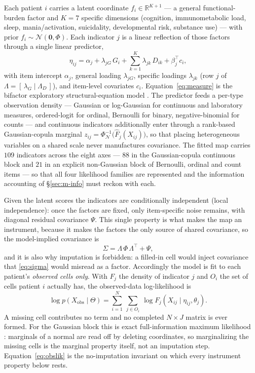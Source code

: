 Each patient $i$ carries a latent coordinate $f_i\in\mathbb{R}^{K+1}$ --- a general
functional-burden factor \Gfac{} and $K=7$ specific dimensions (cognition,
immunometabolic load, sleep, mania/activation, suicidality, developmental risk,
substance use) --- with prior $f_i\sim\mathcal N(\mathbf 0,\Phi)$. Each indicator
$j$ is a linear reflection of those factors through a single linear predictor,
\begin{equation}
  \eta_{ij}=\alpha_j+\lambda_{jG}\,G_i+\sum_{k=1}^{K}\lambda_{jk}\,D_{ik}+\beta_j^{\top}c_i ,
  \label{eq:measure}
\end{equation}
with item intercept $\alpha_j$, general loading $\lambda_{jG}$, specific loadings
$\lambda_{jk}$ (row $j$ of $\Lambda=[\,\lambda_G\mid\Lambda_D\,]$), and item-level
covariates $c_i$. Equation~\eqref{eq:measure} is the bifactor exploratory
structural-equation model \citep{reise2012bifactor,asparouhov2009esem}. The
predictor feeds a per-type observation density --- Gaussian or log-Gaussian for
continuous and laboratory measures, ordered-logit for ordinal, Bernoulli for
binary, negative-binomial for counts --- and continuous indicators additionally
enter through a rank-based Gaussian-copula marginal
$z_{ij}=\Phi_{\mathcal N}^{-1}\!\big(\hat F_j(X_{ij})\big)$, so that placing
heterogeneous variables on a shared scale never manufactures covariance. The fitted map carries $109$ indicators
across the eight axes --- $88$ in the Gaussian-copula continuous block and $21$ in an
explicit non-Gaussian block of Bernoulli, ordinal and count items --- so that all four
likelihood families are represented and the information accounting of
\S\ref{sec:m-info} must reckon with each.

Given the latent scores the indicators are conditionally independent (local
independence): once the factors are fixed, only item-specific noise remains, with
diagonal residual covariance $\Psi$. This single property is what makes the map an
instrument, because it makes the factors the only source of shared covariance, so
the model-implied covariance is
\begin{equation}
  \Sigma=\Lambda\,\Phi\,\Lambda^{\top}+\Psi ,
  \label{eq:sigma}
\end{equation}
and it is also why imputation is forbidden: a filled-in cell would inject
covariance that \eqref{eq:sigma} would misread as a factor. Accordingly the model
is fit to each patient's \emph{observed cells only}. With $F_j$ the density of
indicator $j$ and $O_i$ the set of cells patient $i$ actually has, the
observed-data log-likelihood is
\begin{equation}
  \log p\!\left(X_{\mathrm{obs}}\mid\Theta\right)=\sum_{i=1}^{N}\ \sum_{j\in O_i}\ \log F_j\!\left(X_{ij}\mid\eta_{ij},\theta_j\right) .
  \label{eq:obslik}
\end{equation}
A missing cell contributes no term and no completed $N\times J$ matrix is ever
formed. For the Gaussian block this is exact full-information maximum likelihood
\citep{rubin1976missing,littlerubin2019}: marginals of a normal are read off by
deleting coordinates, so marginalizing the missing cells is the marginal property
itself, not an imputation step. Equation~\eqref{eq:obslik} is the no-imputation
invariant on which every instrument property below rests.

